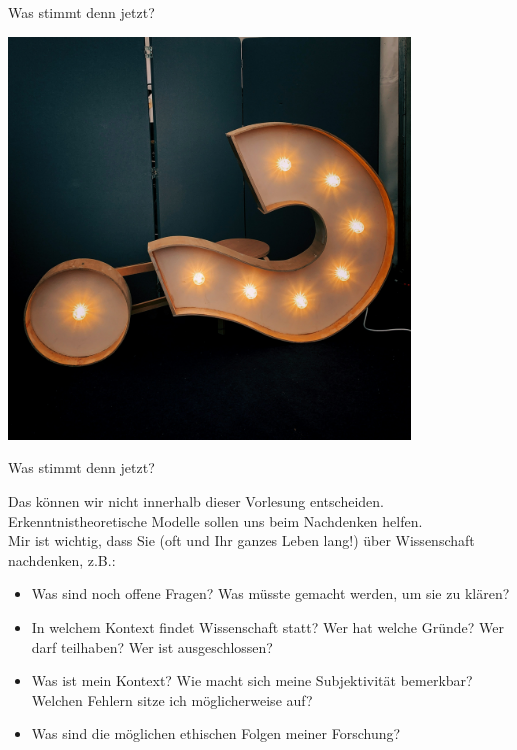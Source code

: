 \documentclass{beamer}
\begin{document}
\begin{frame}{Was stimmt denn jetzt?}

\centering

\includegraphics[width=0.8\textwidth]{jon-tyson-hhq1Lxtuwd8-unsplash.jpg}

\end{frame}

\begin{frame}{Was stimmt denn jetzt?}

Das können wir nicht innerhalb dieser Vorlesung entscheiden. Erkenntnistheoretische Modelle sollen uns beim Nachdenken helfen. \\[0.5] 

Mir ist wichtig, dass Sie (oft und Ihr ganzes Leben lang!) über Wissenschaft nachdenken, z.B.:

\begin{itemize}
    \item 
    Was sind noch offene Fragen? Was müsste gemacht werden, um sie zu klären?
    \item 
    In welchem Kontext findet Wissenschaft statt? Wer hat welche Gründe? Wer darf teilhaben? Wer ist ausgeschlossen?
    \item 
    Was ist mein Kontext? Wie macht sich meine Subjektivität bemerkbar? Welchen Fehlern sitze ich möglicherweise auf? 
    \item 
    Was sind die möglichen ethischen Folgen meiner Forschung? 
\end{itemize}


\end{frame}
\end{document}
